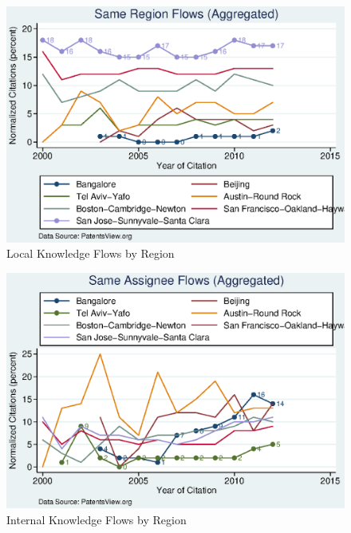 \documentclass[12pt]{article}
\begin{document}
\begin{figure}[h]
\begin{centering}
  \includegraphics[width=\textwidth]{SameRegionFlows}
  \caption{Local Knowledge Flows by Region}
  \label{fig:SameRegionFlows}
\end{centering}
\end{figure}

\begin{figure}[h]
\begin{centering}
  \includegraphics[width=\textwidth]{SameAssigneeFlows}
  \caption{Internal Knowledge Flows by Region}
  \label{fig:SameAssigneeFlows}
\end{centering}
\end{figure}
\end{document}
